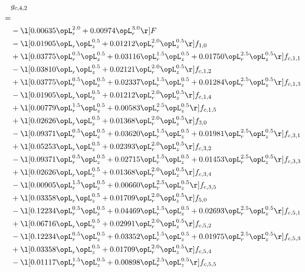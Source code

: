 \begin{alignat}{2} 
\label{eq:g_42_0} 
& g_{c,4,2} \nonumber \\ 
 = \\ 
& - \l[  0.00635 \opL_r^{2.0} +  0.00974 \opL_r^{3.0}  \r] F \nonumber \\ 
& - \l[  0.01905 \opL_r \opL_z^{0.5} +  0.01212 \opL_r^{2.0} \opL_z^{0.5}  \r] f_{1,0} \nonumber \\ 
& + \l[  0.03775 \opL_r^{0.5} \opL_z^{0.5} +  0.03116 \opL_r^{1.5} \opL_z^{0.5} +  0.01750 \opL_r^{2.5} \opL_z^{0.5}  \r] f_{c,1,1} \nonumber \\ 
& - \l[  0.03810 \opL_r \opL_z^{0.5} +  0.02121 \opL_r^{2.0} \opL_z^{0.5}  \r] f_{c,1,2} \nonumber \\ 
& + \l[  0.03775 \opL_r^{0.5} \opL_z^{0.5} +  0.02337 \opL_r^{1.5} \opL_z^{0.5} +  0.01284 \opL_r^{2.5} \opL_z^{0.5}  \r] f_{c,1,3} \nonumber \\ 
& - \l[  0.01905 \opL_r \opL_z^{0.5} +  0.01212 \opL_r^{2.0} \opL_z^{0.5}  \r] f_{c,1,4} \nonumber \\ 
& + \l[  0.00779 \opL_r^{1.5} \opL_z^{0.5} +  0.00583 \opL_r^{2.5} \opL_z^{0.5}  \r] f_{c,1,5} \nonumber \\ 
& + \l[  0.02626 \opL_r \opL_z^{0.5} +  0.01368 \opL_r^{2.0} \opL_z^{0.5}  \r] f_{3,0} \nonumber \\ 
& - \l[  0.09371 \opL_r^{0.5} \opL_z^{0.5} +  0.03620 \opL_r^{1.5} \opL_z^{0.5} +  0.01981 \opL_r^{2.5} \opL_z^{0.5}  \r] f_{c,3,1} \nonumber \\ 
& + \l[  0.05253 \opL_r \opL_z^{0.5} +  0.02393 \opL_r^{2.0} \opL_z^{0.5}  \r] f_{c,3,2} \nonumber \\ 
& - \l[  0.09371 \opL_r^{0.5} \opL_z^{0.5} +  0.02715 \opL_r^{1.5} \opL_z^{0.5} +  0.01453 \opL_r^{2.5} \opL_z^{0.5}  \r] f_{c,3,3} \nonumber \\ 
& + \l[  0.02626 \opL_r \opL_z^{0.5} +  0.01368 \opL_r^{2.0} \opL_z^{0.5}  \r] f_{c,3,4} \nonumber \\ 
& - \l[  0.00905 \opL_r^{1.5} \opL_z^{0.5} +  0.00660 \opL_r^{2.5} \opL_z^{0.5}  \r] f_{c,3,5} \nonumber \\ 
& + \l[  0.03358 \opL_r \opL_z^{0.5} +  0.01709 \opL_r^{2.0} \opL_z^{0.5}  \r] f_{5,0} \nonumber \\ 
& - \l[  0.12234 \opL_r^{0.5} \opL_z^{0.5} +  0.04469 \opL_r^{1.5} \opL_z^{0.5} +  0.02693 \opL_r^{2.5} \opL_z^{0.5}  \r] f_{c,5,1} \nonumber \\ 
& + \l[  0.06716 \opL_r \opL_z^{0.5} +  0.02991 \opL_r^{2.0} \opL_z^{0.5}  \r] f_{c,5,2} \nonumber \\ 
& - \l[  0.12234 \opL_r^{0.5} \opL_z^{0.5} +  0.03352 \opL_r^{1.5} \opL_z^{0.5} +  0.01975 \opL_r^{2.5} \opL_z^{0.5}  \r] f_{c,5,3} \nonumber \\ 
& + \l[  0.03358 \opL_r \opL_z^{0.5} +  0.01709 \opL_r^{2.0} \opL_z^{0.5}  \r] f_{c,5,4} \nonumber \\ 
& - \l[  0.01117 \opL_r^{1.5} \opL_z^{0.5} +  0.00898 \opL_r^{2.5} \opL_z^{0.5}  \r] f_{c,5,5} \nonumber \\ 
\end{alignat} 


